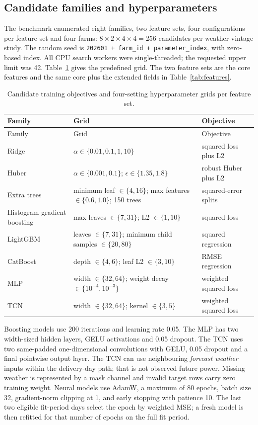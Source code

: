 \documentclass[11pt,a4paper]{article}
\newcommand{\code}[1]{\nolinkurl{#1}}
\begin{document}
\subsection{Candidate families and hyperparameters}
The benchmark enumerated eight families, two feature sets, four configurations per feature set and four farms: $8\times2\times4\times4=256$ candidates per weather-vintage study. The random seed is \code{202601 + farm_id + parameter_index}, with zero-based index. All CPU search workers were single-threaded; the requested upper limit was 42. Table~\ref{tab:grid} gives the predefined grid. The two feature sets are the core features and the same core plus the extended fields in Table~\ref{tab:features}.
\begin{longtable}{p{3.1cm}p{8.9cm}p{3cm}}
\caption{Candidate training objectives and four-setting hyperparameter grids per feature set.}\label{tab:grid}\\
\toprule Family & Grid & Objective\\\midrule\endfirsthead
\toprule Family & Grid & Objective\\\midrule\endhead
Ridge & $\alpha\in\{0.01,0.1,1,10\}$ & squared loss plus L2\\
Huber & $\alpha\in\{0.001,0.1\}$; $\epsilon\in\{1.35,1.8\}$ & robust Huber plus L2\\
Extra trees & minimum leaf $\in\{4,16\}$; max features $\in\{0.6,1.0\}$; 150 trees & squared-error splits\\
Histogram gradient boosting & max leaves $\in\{7,31\}$; L2 $\in\{1,10\}$ & squared loss\\
LightGBM & leaves $\in\{7,31\}$; minimum child samples $\in\{20,80\}$ & squared regression\\
CatBoost & depth $\in\{4,6\}$; leaf L2 $\in\{3,10\}$ & RMSE regression\\
MLP & width $\in\{32,64\}$; weight decay $\in\{10^{-4},10^{-3}\}$ & weighted squared loss\\
TCN & width $\in\{32,64\}$; kernel $\in\{3,5\}$ & weighted squared loss\\
\bottomrule\end{longtable}
Boosting models use 200 iterations and learning rate 0.05. The MLP has two width-sized hidden layers, GELU activations and 0.05 dropout. The TCN uses two same-padded one-dimensional convolutions with GELU, 0.05 dropout and a final pointwise output layer. The TCN can use neighbouring \emph{forecast weather} inputs within the delivery-day path; that is not observed future power. Missing weather is represented by a mask channel and invalid target rows carry zero training weight. Neural models use AdamW, a maximum of 80 epochs, batch size 32, gradient-norm clipping at 1, and early stopping with patience 10. The last two eligible fit-period days select the epoch by weighted MSE; a fresh model is then refitted for that number of epochs on the full fit period.
\end{document}

